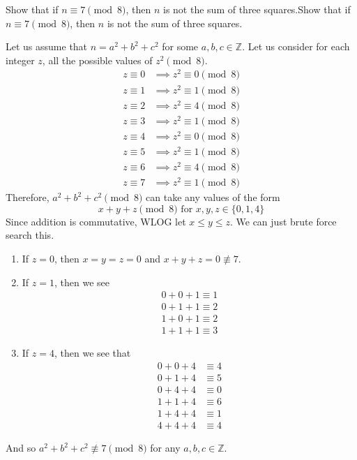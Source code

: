   \begin{exercise}[Shifrin 1.3.15]
    Show that if $n \equiv 7 \pmod{8}$, then $n$ is not the sum of three squares.Show that if $n \equiv 7 \pmod{8}$, then $n$ is not the sum of three squares.
  \end{exercise}
  \begin{solution}
    Let us assume that $n = a^2 + b^2 + c^2$ for some $a, b, c \in \mathbb{Z}$. Let us consider for each integer $z$, all the possible values of $z^2 \pmod{8}$. 
    \begin{align}
      z \equiv 0 & \implies z^2 \equiv 0 \pmod{8} \\
      z \equiv 1 & \implies z^2 \equiv 1 \pmod{8} \\
      z \equiv 2 & \implies z^2 \equiv 4 \pmod{8} \\
      z \equiv 3 & \implies z^2 \equiv 1 \pmod{8} \\
      z \equiv 4 & \implies z^2 \equiv 0 \pmod{8} \\
      z \equiv 5 & \implies z^2 \equiv 1 \pmod{8} \\
      z \equiv 6 & \implies z^2 \equiv 4 \pmod{8} \\
      z \equiv 7 & \implies z^2 \equiv 1 \pmod{8} 
    \end{align}
    Therefore, $a^2 + b^2 + c^2 \pmod{8}$ can take any values of the form 
    \begin{equation}
      x + y + z \pmod{8} \text{ for } x, y, z \in \{0, 1, 4\}
    \end{equation}
    Since addition is commutative, WLOG let $x \leq y \leq z$. We can just brute force search this. 
    \begin{enumerate}
      \item If $z = 0$, then $x = y = z = 0$ and $x + y + z = 0 \not\equiv 7$. 
      \item If $z = 1$, then we see 
      \begin{align}
        0 + 0 + 1 \equiv 1 \\ 
        0 + 1 + 1 \equiv 2 \\ 
        1 + 0 + 1 \equiv 2 \\ 
        1 + 1 + 1 \equiv 3 
      \end{align}
      \item If $z = 4$, then we see that 
        \begin{align}
          0 + 0 + 4 & \equiv 4 \\
          0 + 1 + 4 & \equiv 5 \\
          0 + 4 + 4 & \equiv 0 \\
          1 + 1 + 4 & \equiv 6 \\
          1 + 4 + 4 & \equiv 1 \\
          4 + 4 + 4 & \equiv 4
        \end{align}
    \end{enumerate}
    And so $a^2 + b^2 + c^2 \not\equiv 7 \pmod{8}$ for any $a, b, c \in \mathbb{Z}$. 
  \end{solution}

